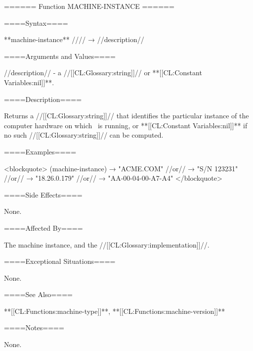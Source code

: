 ====== Function MACHINE-INSTANCE ======

====Syntax====

**machine-instance** //\noargs// → //description//

====Arguments and Values====

//description// - a //[[CL:Glossary:string]]// or **[[CL:Constant Variables:nil]]**.

====Description====

Returns a //[[CL:Glossary:string]]// that identifies the particular instance of the computer hardware on which \clisp\ is running, or **[[CL:Constant Variables:nil]]** if no such //[[CL:Glossary:string]]// can be computed.

====Examples====

<blockquote> (machine-instance) → "ACME.COM" //or// → "S/N 123231" //or// → "18.26.0.179" //or// → "AA-00-04-00-A7-A4" </blockquote>

====Side Effects====

None.

====Affected By====

The machine instance, and the //[[CL:Glossary:implementation]]//.

====Exceptional Situations====

None.

====See Also====

**[[CL:Functions:machine-type]]**, **[[CL:Functions:machine-version]]**

====Notes====

None.

